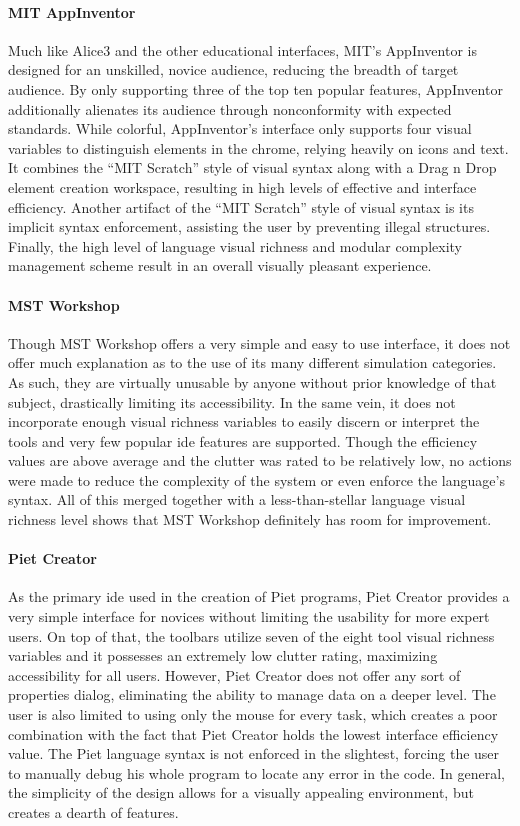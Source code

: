 \paragraph{MIT AppInventor} Much like Alice3 and the other educational
interfaces, MIT's AppInventor is designed for an unskilled, novice
audience, reducing the breadth of target audience. By only supporting three
of the top ten popular features, AppInventor additionally alienates its
audience through nonconformity with expected standards. While colorful,
AppInventor's interface only supports four visual variables to distinguish
elements in the chrome, relying heavily on icons and text. It
combines the ``MIT Scratch'' style of visual syntax along with a Drag n
Drop element creation workspace, resulting in high levels of effective and
interface efficiency. Another artifact of the ``MIT Scratch'' style of
visual syntax is its implicit syntax enforcement, assisting the user by
preventing illegal structures. Finally, the high level of language visual
richness and modular complexity management scheme result in an overall
visually pleasant experience.

\paragraph{MST Workshop} Though MST Workshop offers a very simple and easy
to use interface, it does not offer much explanation as to the use of its
many different simulation categories. As such, they are virtually unusable
by anyone without prior knowledge of that subject, drastically limiting its
accessibility. In the same vein, it does not incorporate enough visual
richness variables to easily discern or interpret the tools and very few
popular \ac{ide} features are supported. Though the efficiency values are
above average and the clutter was rated to be relatively low, no
actions were made to reduce the complexity of the system or even enforce
the language's syntax. All of this merged together with a less-than-stellar
language visual richness level shows that MST Workshop definitely has room
for improvement.

\paragraph{Piet Creator} As the primary \ac{ide} used in the creation of
Piet programs, Piet Creator provides a very simple
interface for novices without limiting the usability for more expert users.
On top of that, the toolbars utilize seven of the eight tool visual
richness variables and it possesses an extremely low clutter rating,
maximizing accessibility for all users.  However, Piet Creator does not
offer any sort of properties dialog, eliminating the ability to manage data
on a deeper level. The user is also limited to using only the mouse for
every task, which creates a poor combination with the fact that Piet
Creator holds the lowest interface efficiency value. The Piet language
syntax is not enforced in the slightest, forcing the user to manually debug
his whole program to locate any error in the code. In general, the
simplicity of the design allows for a visually
appealing environment, but creates a dearth of features.

